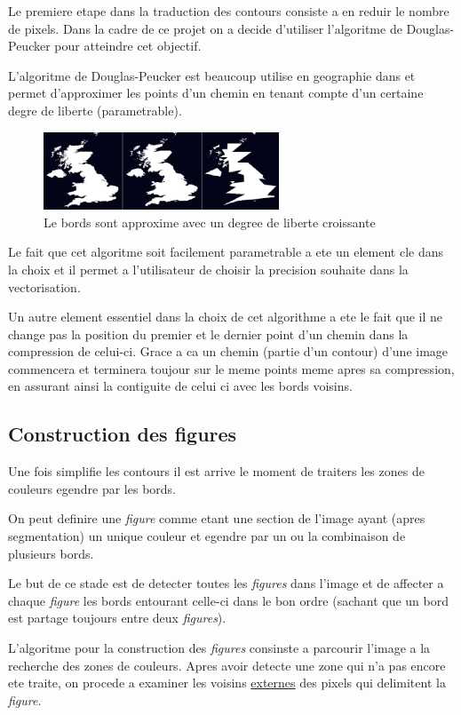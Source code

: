\documentclass[twoside,openright,a4paper,11pt,french]{article}
\begin{document}
Le premiere etape dans la traduction des contours consiste a en reduir
le nombre de pixels. Dans la cadre de ce projet on a decide d'utiliser
l'algoritme de Douglas-Peucker pour atteindre cet objectif.

L'algoritme de Douglas-Peucker est beaucoup utilise en geographie dans
et permet d'approximer les points d'un chemin en tenant compte d'un
certaine degre de liberte (parametrable).

\begin{figure}[h]
\centering
\includegraphics[width=7cm]{./pics/dp1.eps}
\caption{Le bords sont approxime avec un degree de liberte croissante}
\label{fig:routcidr}
\end{figure}

Le fait que cet algoritme soit facilement parametrable a ete un
element cle dans la choix et il permet a l'utilisateur de choisir la
precision souhaite dans la vectorisation.

Un autre element essentiel dans la choix de cet algorithme a ete le
fait que il ne change pas la position du premier et le dernier point
d'un chemin dans la compression de celui-ci. Grace a ca un chemin
(partie d'un contour) d'une image commencera et terminera toujour sur
le meme points meme apres sa compression, en assurant ainsi la
contiguite de celui ci avec les bords voisins.



\subsection{Construction des figures}
Une fois simplifie les contours il est arrive le moment de traiters
les zones de couleurs egendre par les bords.

On peut definire une {\it figure} comme etant une section de l'image
ayant (apres segmentation) un unique couleur et egendre par un ou
la combinaison de plusieurs bords.

Le but de ce stade est de detecter toutes les {\it figures} dans l'image et
de affecter a chaque {\it figure} les bords entourant celle-ci dans le
bon ordre (sachant que un bord est partage toujours entre deux
{\it figures}).

L'algoritme pour la construction des {\it figures} consinste a parcourir
l'image a la recherche des zones de couleurs. Apres avoir detecte une
zone qui n'a pas encore ete traite, on procede a examiner les voisins
\underline{externes} des pixels qui delimitent la {\it figure}.
\end{document}
